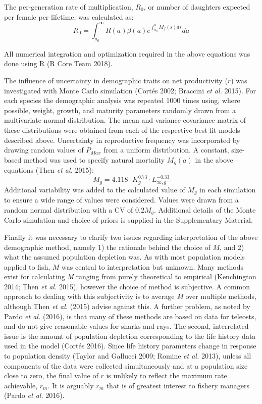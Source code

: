 \documentclass[]{article}
\begin{document}
The per-generation rate of multiplication, \(R_0\), or number of
daughters expected per female per lifetime, was calculated as:
\[R_0 =\int_{a_0}^{\infty}R(a)\beta(a)e^{\int_{a_0}^{a}M_f(s) ds}da \]

All numerical integration and optimization required in the above
equations was done using R (R Core Team 2018).

The influence of uncertainty in demographic traits on net productivity
(\(r\)) was investigated with Monte Carlo simulation (Cortés 2002;
Braccini \emph{et al.} 2015). For each species the demographic analysis
was repeated 1000 times using, where possible, weight, growth, and
maturity parameters randomly drawn from a multivariate normal
distribution. The mean and variance-covariance matrix of these
distributions were obtained from each of the respective best fit models
described above. Uncertainty in reproductive frequency was incorporated
by drawing random values of \(P_{Max}\) from a uniform distribution. A
constant, size-based method was used to specify natural mortality
\(M_g(a)\) in the above equations (Then \emph{et al.} 2015):
\[M_g = 4.118 \cdot K_g^{0.73} \cdot L_{\infty,g}^{-0.33}\] Additional
variability was added to the calculated value of \(M_g\) in each
simulation to ensure a wide range of values were considered. Values were
drawn from a random normal distribution with a CV of \(0.2M_g\).
Additional details of the Monte Carlo simulation and choice of priors is
supplied in the Supplementary Material.

Finally it was necessary to clarify two issues regarding interpretation
of the above demographic method, namely 1) the rationale behind the
choice of \(M\), and 2) what the assumed population depletion was. As
with most population models applied to fish, \(M\) was central to
interpretation but unknown. Many methods exist for calculating \emph{M}
ranging from purely theoretical to empirical (Kenchington 2014; Then
\emph{et al.} 2015), however the choice of method is subjective. A
common approach to dealing with this subjectivity is to average \emph{M}
over multiple methods, although Then \emph{et al.} (2015) advise against
this. A further problem, as noted by Pardo \emph{et al.} (2016), is that
many of these methods are based on data for teleosts, and do not give
reasonable values for sharks and rays. The second, interrelated issue is
the amount of population depletion corresponding to the life history
data used in the model (Cortés 2016). Since life history parameters
change in response to population density (Taylor and Gallucci 2009;
Romine \emph{et al.} 2013), unless all components of the data were
collected simultaneously and at a population size close to zero, the
final value of \(r\) is unlikely to reflect the maximum rate achievable,
\(r_m\). It is arguably \(r_m\) that is of greatest interest to fishery
managers (Pardo \emph{et al.} 2016).
\end{document}
